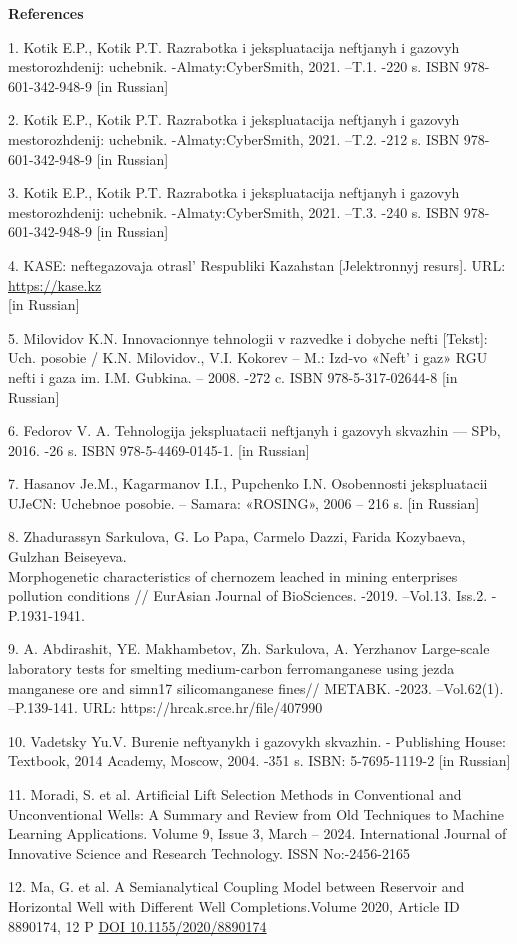\begin{center}
{\bfseries References}
\end{center}

\begin{references}
1. Kotik E.P., Kotik P.T. Razrabotka i jekspluatacija neftjanyh i
gazovyh mestorozhdenij: uchebnik. -Almaty:CyberSmith, 2021. --T.1. -220
s. ISBN 978-601-342-948-9 {[}in Russian{]}

2. Kotik E.P., Kotik P.T. Razrabotka i jekspluatacija neftjanyh i
gazovyh mestorozhdenij: uchebnik. -Almaty:CyberSmith, 2021. --T.2. -212
s. ISBN 978-601-342-948-9 {[}in Russian{]}

3. Kotik E.P., Kotik P.T. Razrabotka i jekspluatacija neftjanyh i
gazovyh mestorozhdenij: uchebnik. -Almaty:CyberSmith, 2021. --T.3. -240
s. ISBN 978-601-342-948-9 {[}in Russian{]}

4. KASE: neftegazovaja otrasl'{} Respubliki Kazahstan
{[}Jelektronnyj resurs{]}. URL:
\href{https://kase.kz/files/presentations/ru/KASE_OilGas_industry_2019.pdf}{https://kase.kz}\\
{[}in Russian{]}

5. Milovidov K.N. Innovacionnye tehnologii v razvedke i dobyche nefti
{[}Tekst{]}: Uch. posobie / K.N. Milovidov., V.I. Kokorev -- M.: Izd-vo
«Neft'{} i gaz» RGU nefti i gaza im. I.M. Gubkina. --
2008. -272 c. ISBN 978-5-317-02644-8 {[}in Russian{]}

6. Fedorov V. A. Tehnologija jekspluatacii neftjanyh i gazovyh skvazhin
--- SPb, 2016. -26 s. ISBN 978-5-4469-0145-1. {[}in Russian{]}

7. Hasanov Je.M., Kagarmanov I.I., Pupchenko I.N. Osobennosti
jekspluatacii UJeCN: Uchebnoe posobie. -- Samara: «ROSING», 2006 -- 216
s. {[}in Russian{]}

8. Zhadurassyn Sarkulova, G. Lo Papa, Carmelo Dazzi, Farida Kozybaeva,
Gulzhan Beiseyeva. \\Morphogenetic characteristics of chernozem leached in
mining enterprises pollution conditions // EurAsian Journal of
BioSciences. -2019. --Vol.13. Iss.2. - P.1931-1941.

9. A. Abdirashit, YE. Makhambetov, Zh. Sarkulova, A. Yerzhanov
Large-scale laboratory tests for smelting medium-carbon ferromanganese
using jezda manganese ore and simn17 silicomanganese fines// METABK.
-2023. --Vol.62(1). --P.139-141. URL: https://hrcak.srce.hr/file/407990

10. Vadetsky Yu.V. Burenie neftyanykh i gazovykh skvazhin. - Publishing
House: Textbook, 2014 Academy, Moscow, 2004. -351 s. ISBN: 5-7695-1119-2
{[}in Russian{]}

11. Moradi, S. et al. Artificial Lift Selection Methods in Conventional
and Unconventional Wells: A Summary and Review from Old Techniques to
Machine Learning Applications. Volume 9, Issue 3, March -- 2024.
International Journal of Innovative Science and Research Technology.
ISSN No:-2456-2165

12. Ma, G. et al. A Semianalytical Coupling Model between Reservoir and
Horizontal Well with Different Well Completions.Volume 2020, Article ID
8890174, 12 P \href{https://doi.org/10.1155/2020/8890174}{DOI 10.1155/2020/8890174}
\end{references}

